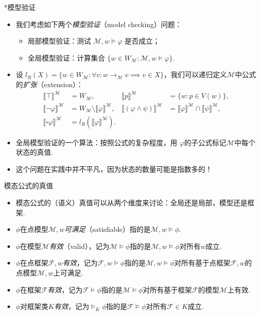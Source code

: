     \begin{frame}{*模型验证}
    \begin{itemize}
        \item 我们考虑如下两个\emph{模型验证}（model checking）问题：
        \begin{itemize}
        \item 局部模型验证：测试 $\mathcal M,w \vDash \varphi$ 是否成立；
        \item 全局模型验证：计算集合 $\{w \in W_{\mathcal M} : \mathcal M,w \vDash \varphi\}$.
        \end{itemize}
        \item 设 $l_R(X) = \{w \in W_{\mathcal M} : \forall v : w \to_{\mathcal M} v \implies v \in X\}$，我们可以递归定义$\mathcal M$中公式的\emph{扩张}（extension）：
    \[\begin{array}{rlrl}\llbracket \top \rrbracket^{\mathcal{M}} & =W_{\mathcal{M}}, & \llbracket p \rrbracket^{\mathcal{M}} & =\{w : p \in V(w)\}, \\ 
    \llbracket \neg \varphi \rrbracket^{\mathcal{M}} & =W_{\mathcal M}\setminus \llbracket \varphi \rrbracket^{\mathcal{M}}, & \llbracket(\varphi \wedge \psi) \rrbracket^{\mathcal{M}} & =\llbracket \varphi \rrbracket^{\mathcal{M}} \cap \llbracket \psi \rrbracket^{\mathcal{M}}, \\
    \llbracket \square \varphi \rrbracket^{\mathcal{M}} & =l_R\left(\llbracket \varphi \rrbracket^{\mathcal{M}}\right).\end{array}\]
        \item 全局模型验证的一个算法：按照公式的复杂程度，用 $\varphi$的子公式标记$\mathcal M$中每个状态的真值.
        \item 这个问题在实践中并不平凡，因为状态的数量可能是指数多的！
    \end{itemize}
    \end{frame}
    
    \begin{frame}{模态公式的真值} %
    \begin{itemize}
        \item 模态公式的（语义）真值可以从两个维度来讨论：全局还是局部，模型还是框架.
        \item $\phi$在点模型$\mathcal M,w$\emph{可满足}（satisfiable）指的是$\mathcal M,w\vDash \phi$.
        \item $\phi$在模型$\mathcal M$\emph{有效}（valid），记为$\mathcal M\vDash \phi$指的是$\mathcal M,w\vDash\phi$对所有$w$成立.
        \item $\phi$在点框架$\mathcal F,w$\emph{有效}，记为$\mathcal F,w\vDash \phi$指的是$\mathcal M,w\vDash\phi$对所有基于点框架$\mathcal F,w$的点模型$\mathcal M, w$上可满足.
        \item $\phi$在框架$\mathcal F$\emph{有效}，记为$\mathcal F\vDash \phi$指的是$\mathcal M\vDash\phi$对所有基于框架$\mathcal F$的模型$\mathcal M$上有效.
        \item $\phi$对框架类$K$\emph{有效}，记为$\vDash_K\phi$指的是$\mathcal F\vDash\phi$对所有$\mathcal F\in K$成立.
    \end{itemize}
    \end{frame}
    
